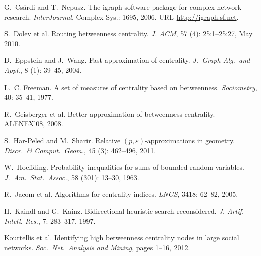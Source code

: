 \begin{thebibliography}{33}
G.~Cs\'{a}rdi and T.~Nepusz.
\newblock The igraph software package for complex network research.
\newblock \emph{InterJournal}, Complex Sys.: 1695, 2006.
\newblock URL \url{http://igraph.sf.net}.

S.~Dolev et al.
\newblock Routing betweenness centrality.
\newblock \emph{J. ACM}, 57 (4): 25:1--25:27, May 2010.

D.~Eppstein and J.~Wang.
\newblock Fast approximation of centrality.
\newblock \emph{J.~Graph Alg.~and Appl.}, 8
  (1): 39--45, 2004.

L.~C. Freeman.
\newblock A set of measures of centrality based on betweenness.
\newblock \emph{Sociometry}, 40: 35--41, 1977.

R.~Geisberger et al.
\newblock Better approximation of betweenness centrality.
\newblock ALENEX'08, 2008.

S.~Har-Peled and M.~Sharir.
\newblock Relative $(p,\varepsilon)$-approximations in geometry.
\newblock \emph{Discr.~\& Comput.~Geom.}, 45 (3):
  462--496, 2011.

W.~Hoeffding.
\newblock Probability inequalities for sums of bounded random variables.
\newblock \emph{J.~Am.~Stat.~Assoc.}, 58
  (301): 13--30, 1963.

R.~Jacom et al.
\newblock Algorithms for centrality indices.
\newblock \emph{LNCS}, 3418: 62--82, 2005.

H.~Kaindl and G.~Kainz.
\newblock Bidirectional heuristic search reconsidered.
\newblock \emph{J. Artif. Intell. Res.}, 7: 283--317, 1997.

Kourtellis et al.
\newblock Identifying high betweenness centrality nodes in large social
  networks.
\newblock \emph{Soc.~Net.~Analysis and Mining}, pages 1--16, 2012.


\end{thebibliography}
